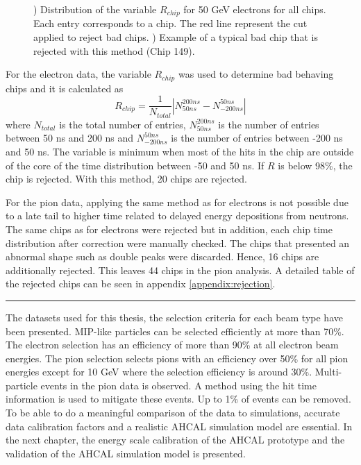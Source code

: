 \begin{figure}[htbp!]
\begin{subfigure}[t]{0.49\textwidth}
		\caption{} \label{fig:ExBadChip}
	\end{subfigure}
	\caption{) Distribution of the variable $R_{chip}$ for 50 GeV electrons for all chips. Each entry corresponds to a chip. The red line represent the cut applied to reject bad chips. ) Example of a typical bad chip that is rejected with this method (Chip 149).}
\end{figure}

For the electron data, the variable $R_{chip}$ was used to determine bad behaving chips and it is calculated as
\begin{equation} \label{eq:fraction_rejection}
	R_{chip} = \frac{1}{N_{total}} \left| N_{50 ns}^{200 ns} - N_{-200 ns}^{50 ns} \right|
\end{equation}
where $N_{total}$ is the total number of entries, $N_{50 ns}^{200 ns}$ is the number of entries between 50 ns and 200 ns and $N_{-200 ns}^{50 ns}$ is the number of entries between -200 ns and 50 ns. The variable is minimum when most of the hits in the chip are outside of the core of the time distribution between -50 and 50 ns. If $R$ is below 98\%, the chip is rejected. With this method, 20 chips are rejected.

For the pion data, applying the same method as for electrons is not possible due to a late tail to higher time related to delayed energy depositions from neutrons. The same chips as for electrons were rejected but in addition, each chip time distribution after correction were manually checked. The chips that presented an abnormal shape such as double peaks were discarded. Hence, 16 chips are additionally rejected. This leaves 44 chips in the pion analysis. A detailed table of the rejected chips can be seen in appendix \ref{appendix:rejection}.

\newpage
\begin{center}
  \rule{0.5\textwidth}{.4pt}
\end{center}

The datasets used for this thesis, the selection criteria for each beam type have been presented. MIP-like particles can be selected efficiently at more than 70\%. The electron selection has an efficiency of more than 90\% at all electron beam energies. The pion selection selects pions with an efficiency over 50\% for all pion energies except for 10 GeV where the selection efficiency is around 30\%. Multi-particle events in the pion data is observed. A method using the hit time information is used to mitigate these events. Up to 1\% of events can be removed. To be able to do a meaningful comparison of the data to simulations, accurate data calibration factors and a realistic AHCAL simulation model are essential. In the next chapter, the energy scale calibration of the AHCAL prototype and the validation of the AHCAL simulation model is presented.
